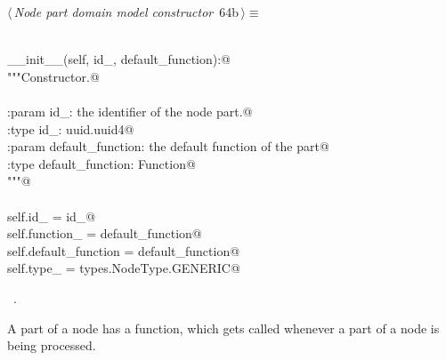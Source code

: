 \documentclass[
    a4paper,      %
    10pt,         %
    openright,    %
    notitlepage,  %
    parskip=half, %
]{scrreprt}       %
\theoremstyle{definition}                    %
\begin{document}
\begin{flushleft} \small
\begin{minipage}{\linewidth}\label{scrap107}\raggedright\small
{} $\langle\,${\itshape Node part domain model constructor}\nobreak\ {\footnotesize {64b}}$\,\rangle\equiv$
\vspace{-1exm}
\begin{list}{}{} \item
\mbox{}\lstinline@@\\
\mbox{}\lstinline@def __init__(self, id_, default_function):@\\
\mbox{}\lstinline@    """Constructor.@\\
\mbox{}\lstinline@@\\
\mbox{}\lstinline@    :param id_: the identifier of the node part.@\\
\mbox{}\lstinline@    :type  id_: uuid.uuid4@\\
\mbox{}\lstinline@    :param default_function: the default function of the part@\\
\mbox{}\lstinline@    :type default_function: Function@\\
\mbox{}\lstinline@    """@\\
\mbox{}\lstinline@@\\
\mbox{}\lstinline@    self.id_              = id_@\\
\mbox{}\lstinline@    self.function_        = default_function@\\
\mbox{}\lstinline@    self.default_function = default_function@\\
\mbox{}\lstinline@    self.type_            = types.NodeType.GENERIC@{\NWsep}
\end{list}
\vspace{-1.5ex}
\footnotesize
\begin{list}{}{\setlength{\itemsep}{-\parsep}\setlength{\itemindent}{-\leftmargin}}
\item \NWtxtMacroRefIn\ .

\item{}
\end{list}
\end{minipage}\vspace{4ex}
\end{flushleft}
A part of a node has a function, which gets called whenever a part of a node is
being processed.
\end{document}
